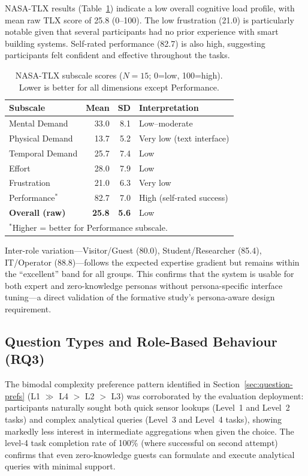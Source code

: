 \documentclass[acmsmall]{acmart}
\begin{document}
NASA-TLX results (Table~\ref{tab:nasa-tlx}) indicate a low overall cognitive load profile, with mean raw TLX score of 25.8 (0--100). The low frustration (21.0) is particularly notable given that several participants had no prior experience with smart building systems. Self-rated performance (82.7) is also high, suggesting participants felt confident and effective throughout the tasks.

\begin{table}[t]
\centering
\caption{NASA-TLX subscale scores ($N=15$; 0=low, 100=high). Lower is better for all dimensions except Performance.}
\label{tab:nasa-tlx}
\small
\begin{tabular}{@{}lrrl@{}}
\toprule
\textbf{Subscale} & \textbf{Mean} & \textbf{SD} & \textbf{Interpretation} \\
\midrule
Mental Demand    & 33.0 & 8.1 & Low--moderate \\
Physical Demand  & 13.7 & 5.2 & Very low (text interface) \\
Temporal Demand  & 25.7 & 7.4 & Low \\
Effort           & 28.0 & 7.9 & Low \\
Frustration      & 21.0 & 6.3 & Very low \\
Performance$^{*}$ & 82.7 & 7.0 & High (self-rated success) \\
\midrule
\textbf{Overall (raw)} & \textbf{25.8} & \textbf{5.6} & Low \\
\bottomrule
\multicolumn{4}{l}{$^{*}$Higher = better for Performance subscale.}
\end{tabular}
\end{table}

Inter-role variation---Visitor/Guest (80.0), Student/Researcher (85.4), IT/Operator (88.8)---follows the expected expertise gradient but remains within the ``excellent'' band for all groups. This confirms that the system is usable for both expert and zero-knowledge personas without persona-specific interface tuning---a direct validation of the formative study's persona-aware design requirement.

\subsection{Question Types and Role-Based Behaviour (RQ3)}
\label{sec:rq3-roles}

The bimodal complexity preference pattern identified in Section~\ref{sec:question-prefs} (L1 $\gg$ L4 $>$ L2 $>$ L3) was corroborated by the evaluation deployment: participants naturally sought both quick sensor lookups (Level~1 and Level~2 tasks) and complex analytical queries (Level~3 and Level~4 tasks), showing markedly less interest in intermediate aggregations when given the choice. The level-4 task completion rate of 100\% (where successful on second attempt) confirms that even zero-knowledge guests can formulate and execute analytical queries with minimal support.
\end{document}
